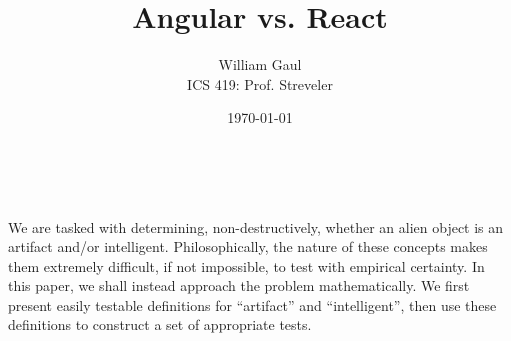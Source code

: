\documentclass[12pt,letterpaper]{article}
\title{\textbf{Angular vs. React}}
\author{William Gaul\\{ICS 419: Prof. Streveler}}
\date{\today}
\makeatletter
\renewcommand{\maketitle}{
	\begin{flushright}
		\@author\\\@date
	\end{flushright}
	\begin{center}
		{\LARGE\@title}
	\end{center}
}
\makeatother
\begin{document}
\maketitle

We are tasked with determining, non-destructively, whether an alien object is an artifact and/or intelligent. Philosophically, the nature of these concepts makes them extremely difficult, if not impossible, to test with empirical certainty. In this paper, we shall instead approach the problem mathematically. We first present easily testable definitions for ``artifact'' and ``intelligent'', then use these definitions to construct a set of appropriate tests.









\end{document}
